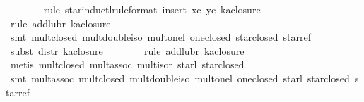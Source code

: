 \begin{isabellebody}
\ \ \ \ \ \ \isamarkupfalse%
\ {}rule\ star{}inductl{}rule{}format{}{}\ insert\ xc\ yc{}\ ka{}closure{}{}\isanewline
\ \ \ \ \ \ \isamarkupfalse%
\ {}rule\ add{}lub{}r{}{}\ ka{}closure{}{}\isanewline
\ \ \ \ \ \ \isamarkupfalse%
\ {}smt\ mult{}closed\ mult{}double{}iso\ mult{}onel\ one{}closed\ star{}closed\ star{}ref{}\isanewline
\ \ \ \ \ \ \isamarkupfalse%
\ {}subst\ distr{}\ ka{}closure{}{}\isanewline
\ \ \ \ \ \ \isamarkupfalse%
\ {}rule\ add{}lub{}r{}{}\ ka{}closure{}{}\isanewline
\ \ \ \ \ \ \isamarkupfalse%
\ {}metis\ mult{}closed\ mult{}assoc\ mult{}isor\ star{}{}l\ star{}closed{}\isanewline
\ \ \ \ \ \ \isamarkupfalse%
\ {}smt\ mult{}assoc\ mult{}closed\ mult{}double{}iso\ mult{}onel\ one{}closed\ star{}{}l\ star{}closed\ star{}ref{}\isanewline

\end{isabellebody}
